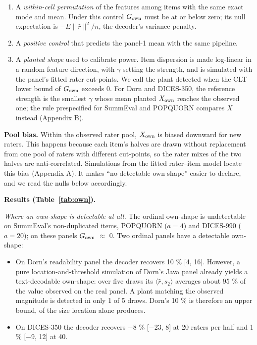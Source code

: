 \documentclass[10pt,twocolumn]{article}
\providecommand{\tightlist}{\setlength{\itemsep}{0pt}\setlength{\parskip}{0pt}}
\begin{document}
\begin{enumerate}
\def\labelenumi{\arabic{enumi}.}
\tightlist
\item
  A \emph{within-cell permutation} of the features among items with the same exact mode and mean. Under this control \(G_{\rm own}\) must be at or below zero; its null expectation is \(-E\|\hat r\|^2/n\), the decoder's variance penalty.
\item
  A \emph{positive control} that predicts the panel-1 mean with the same pipeline.
\item
  A \emph{planted shape} used to calibrate power. Item dispersion is made log-linear in a random feature direction, with $\gamma$ setting the strength, and is simulated with the panel's fitted rater cut-points. We call the plant detected when the CLT lower bound of \(G_{\rm own}\) exceeds 0. For Dorn and DICES-350, the reference strength is the smallest $\gamma$ whose mean planted \(X_{\rm own}\) reaches the observed one; the rule prespecified for SummEval and POPQUORN compares \(X\) instead (Appendix B).
\end{enumerate}

\textbf{Pool bias.} Within the observed rater pool, \(X_{\rm own}\) is biased downward for new raters. This happens because each item's halves are drawn without replacement from one pool of raters with different cut-points, so the rater mixes of the two halves are anti-correlated. Simulations from the fitted rater--item model locate this bias (Appendix A). It makes ``no detectable own-shape'' easier to declare, and we read the nulls below accordingly.

\textbf{Results (Table~\ref{tab:own}).}

\emph{Where an own-shape is detectable at all.} The ordinal own-shape is undetectable on SummEval's non-duplicated items, POPQUORN (\(a=4\)) and DICES-990 (\(a=20\)); on these panels \(G_{\rm own}\) $\approx$ 0. Two ordinal panels have a detectable own-shape:

\begin{itemize}
\tightlist
\item
  On Dorn's readability panel the decoder recovers 10 \% {[}4, 16{]}. However, a pure location-and-threshold simulation of Dorn's Java panel already yields a text-decodable own-shape: over five draws its \(\langle\hat r, s_2\rangle\) averages about 95 \% of the value observed on the real panel. A plant matching the observed magnitude is detected in only 1 of 5 draws. Dorn's 10 \% is therefore an upper bound, of the size location alone produces.
\item
  On DICES-350 the decoder recovers $-$8 \% {[}$-$23, 8{]} at 20 raters per half and 1 \% {[}$-$9, 12{]} at 40.
\end{itemize}
\end{document}
